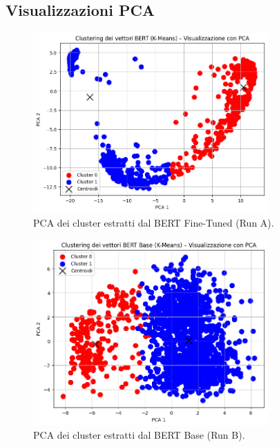 \documentclass[a4paper,12pt]{article}
\begin{document}
\subsection{Visualizzazioni PCA}
\begin{figure}[h]
  \centering
  \includegraphics[width=0.8\textwidth]{1.png}
  \caption{PCA dei cluster estratti dal BERT Fine-Tuned (Run A).}
  \label{fig:pca_tuned}
\end{figure}

\begin{figure}[h]
  \centering
  \includegraphics[width=0.8\textwidth]{3.png}
  \caption{PCA dei cluster estratti dal BERT Base (Run B).}
  \label{fig:pca_untuned}
\end{figure}
\end{document}
